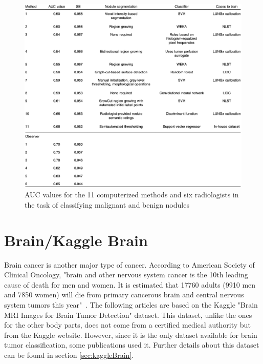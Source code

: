 \begin{figure}[!h]
\centering
\includegraphics[width=1\textwidth, keepaspectratio=true]{./figures/LUNGx_challenge_all_results.png}
\caption{AUC values for the 11 computerized methods and six radiologists in the task of classifying malignant and benign nodules~\cite{12}}
\label{fig:LUNGx_challenge_all_results.png}
\end{figure}



\section{Brain/Kaggle Brain}
Brain cancer is another major type of cancer. According to American Society of Clinical Oncology, "brain and other nervous system cancer is the 10th leading cause of death for men and women. It is estimated that 17760 adults (9910 men and 7850 women) will die from primary cancerous brain and central nervous system tumors this year"~\cite{43}. The following articles are based on the Kaggle "Brain MRI Images for Brain Tumor Detection" dataset. This dataset, unlike the ones for the other body parts, does not come from a certified medical authority but from the Kaggle website. However, since it is the only dataset available for brain tumor classification, some publications used it. Further details about this dataset can be found in section \ref{sec:kaggleBrain}.

